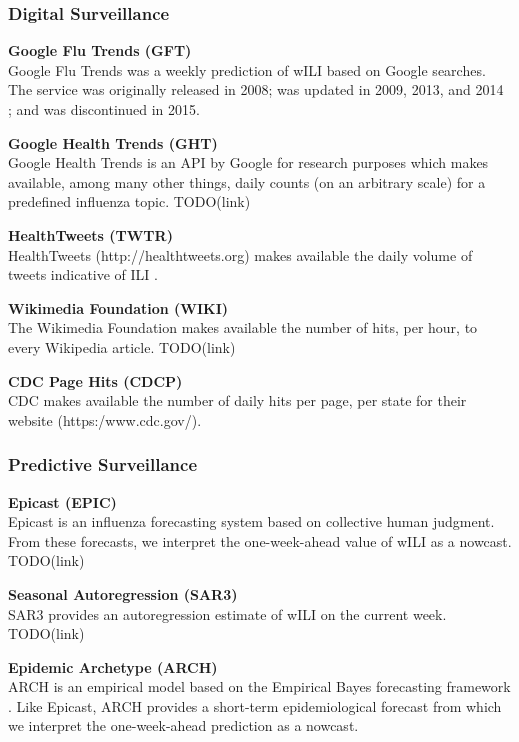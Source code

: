 \documentclass[10pt,letterpaper]{article}
\begin{document}
\subsubsection*{Digital Surveillance}

\begin{description}
  \item{\textbf{Google Flu Trends (GFT)}} \\
    Google Flu Trends was a weekly prediction of wILI based on Google searches.
    The service was originally released in 2008; was updated in 2009, 2013, and
    2014 \cite{ginsberg2009, gft_main}; and was discontinued in 2015.
  \item{\textbf{Google Health Trends (GHT)}} \\
    Google Health Trends is an API by Google for research purposes which makes
    available, among many other things, daily counts (on an arbitrary scale)
    for a predefined influenza topic. TODO(link)
  \item{\textbf{HealthTweets (TWTR)}} \\
    HealthTweets (http://healthtweets.org) makes available the daily volume of
    tweets indicative of ILI \cite{broniatowski2013national,
    dredze2014healthtweets}.
  \item{\textbf{Wikimedia Foundation (WIKI)}} \\
    The Wikimedia Foundation makes available the number of hits, per hour, to
    every Wikipedia article. TODO(link)
  \item{\textbf{CDC Page Hits (CDCP)}} \\
    CDC makes available the number of daily hits per page, per state for their
    website (https:/www.cdc.gov/).
\end{description}

\subsubsection*{Predictive Surveillance}

\begin{description}
  \item{\textbf{Epicast (EPIC)}} \\
    Epicast \cite{farrow2017human} is an influenza forecasting system based on
    collective human judgment. From these forecasts, we interpret the
    one-week-ahead value of wILI as a nowcast. TODO(link)
  \item{\textbf{Seasonal Autoregression (SAR3)}} \\
    SAR3 \cite{farrow2016modeling} provides an autoregression estimate of wILI
    on the current week. TODO(link)
  \item{\textbf{Epidemic Archetype (ARCH)}} \\
    ARCH \cite{farrow2016modeling} is an empirical model based on the Empirical
    Bayes forecasting framework \cite{brooks2015}. Like Epicast, ARCH provides
    a short-term epidemiological forecast from which we interpret the
    one-week-ahead prediction as a nowcast.
\end{description}
\end{document}
